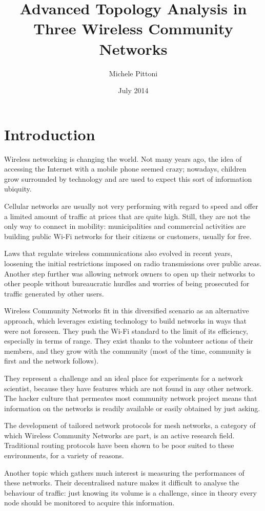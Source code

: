 \documentclass[a4paper,11pt,twoside,openright]{memoir}
\title{Advanced Topology Analysis in Three Wireless Community Networks}
\author{Michele Pittoni}
\date{July 2014}
\begin{document}

\cleardoublepage

\tableofcontents

\chapter*{Introduction}\label{introduction}

Wireless networking is changing the world. Not many years ago, the idea of
accessing the Internet with a mobile phone seemed crazy; nowadays, children
grow surrounded by technology and are used to expect this sort of information
ubiquity.

Cellular networks are usually not very performing with regard to speed and offer
a limited amount of traffic at prices that are quite high.
Still, they are not the only way to connect in mobility: municipalities
and commercial activities are building public Wi-Fi networks for their
citizens or customers, usually for free.

Laws that regulate wireless communications also evolved in recent years,
loosening the initial restrictions imposed on radio transmissions over
public areas.
Another step further was allowing network owners to open up their
networks to other people without bureaucratic hurdles and worries of being
prosecuted for traffic generated by other users.

Wireless Community Networks fit in this diversified scenario as an alternative
approach, which leverages existing technology to build networks in ways that 
were not foreseen.
They push the Wi-Fi standard to the limit of its efficiency, especially
in terms of range. They exist thanks to the volunteer actions of their members,
and they grow with the community (most of the time, community is
first and the network follows).

They represent a challenge and an ideal place for experiments for a network
scientist, because they have features which are not found in any other network.
The hacker culture that permeates most community network project means that
information on the networks is readily available or easily obtained by just
asking.

The development of tailored network protocols for mesh networks, a category
of which Wireless Community Networks are part, is an active research field.
Traditional routing protocols have been shown to be poor suited to these
environments, for a variety of reasons.

Another topic which gathers much interest is measuring the performances
of these networks. Their decentralised nature makes it difficult to analyse
the behaviour of traffic: just knowing its volume is a challenge, since in
theory every node should be monitored to acquire this information.
\end{document}
